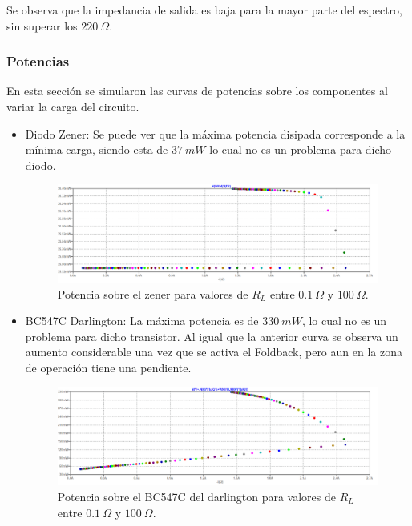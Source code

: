 Se observa que la impedancia de salida es baja para la mayor parte del espectro, sin superar los $220 \ \Omega$.

\subsubsection{Potencias}
\label{sec:sim-pot}
En esta sección se simularon las curvas de potencias sobre los componentes al variar la carga del circuito.

\begin{itemize}
\item Diodo Zener: 
Se puede ver que la máxima potencia disipada corresponde a la mínima carga, siendo esta de $37 \ mW$ lo cual no es un problema para dicho diodo.
\begin{figure}[H]
\centering
	\includegraphics[width=1\textwidth]{ImagenesEjercicio2/potzener.png}
	\caption{Potencia sobre el zener para valores de $R_L$ entre $0.1 \ \Omega$ y $100 \ \Omega$. }
	\label{fig:potzener}
\end{figure}

\item BC547C Darlington: La máxima potencia es de $330 \ mW$, lo cual no es un problema para dicho transistor. Al igual que la anterior curva se observa un aumento considerable una vez que se activa el Foldback, pero aun en la zona de operación tiene una pendiente.
\begin{figure}[H]
\centering
	\includegraphics[width=1\textwidth]{ImagenesEjercicio2/potbc547.png}
	\caption{Potencia sobre el BC547C del darlington para valores de $R_L$ entre $0.1 \ \Omega$ y $100 \ \Omega$.}
	\label{fig:potbc547}
\end{figure}


\end{itemize}
